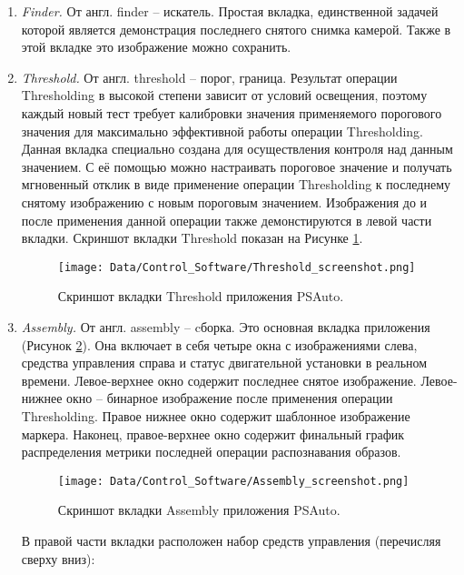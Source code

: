 \begin{enumerate}

\item \emph{Finder.} От англ. finder -- искатель. Простая вкладка, единственной задачей которой является демонстрация последнего снятого снимка камерой. Также в этой вкладке это изображение можно сохранить.

\item \emph{Threshold.} От англ. threshold -- порог, граница. Результат операции Thresholding в высокой степени зависит от условий освещения, поэтому каждый новый тест требует калибровки значения применяемого порогового значения для максимально эффективной работы операции Thresholding. Данная вкладка специально создана для осуществления контроля над данным значением. С её помощью можно настраивать пороговое значение и получать мгновенный отклик в виде применение операции Thresholding к последнему снятому изображению с новым пороговым значением. Изображения до и после применения данной операции также демонстируются в левой части вкладки. Скриншот вкладки Threshold показан на Рисунке \ref{fig:threshold_screenshot}.

\begin{figure}[ht]\centering
\texttt{[image: Data/Control\_Software/Threshold\_screenshot.png]}
\caption{Скриншот вкладки Threshold приложения PSAuto.}
\label{fig:threshold_screenshot}
\end{figure}

\item \emph{Assembly.} От англ. assembly -- cборка. Это основная вкладка приложения (Рисунок \ref{fig:assembly_screenshot}). Она включает в себя четыре окна с изображениями слева, средства управления справа и статус двигательной установки в реальном времени. Левое-верхнее окно содержит последнее снятое изображение. Левое-нижнее окно -- бинарное изображение после применения операции Thresholding. Правое нижнее окно содержит шаблонное изображение маркера. Наконец, правое-верхнее окно содержит финальный график распределения метрики последней операции распознавания образов.

\begin{figure}[ht]\centering
\texttt{[image: Data/Control\_Software/Assembly\_screenshot.png]}
\caption{Скриншот вкладки Assembly приложения PSAuto.}
\label{fig:assembly_screenshot}
\end{figure}

В правой части вкладки расположен набор средств управления (перечисляя сверху вниз):


\end{enumerate}
